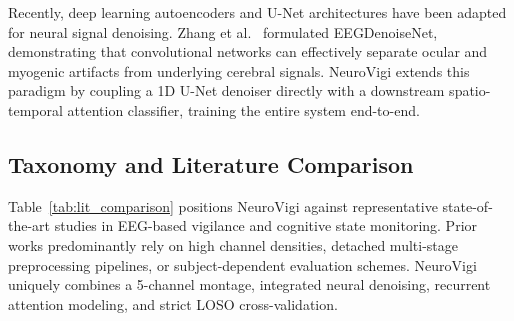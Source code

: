 \documentclass[conference]{IEEEtran}
\begin{document}
Recently, deep learning autoencoders and U-Net architectures have been adapted for neural signal denoising. Zhang et al.~\cite{zhang2021eegdenoisenet} formulated EEGDenoiseNet, demonstrating that convolutional networks can effectively separate ocular and myogenic artifacts from underlying cerebral signals. NeuroVigi extends this paradigm by coupling a 1D U-Net denoiser directly with a downstream spatio-temporal attention classifier, training the entire system end-to-end.

\subsection{Taxonomy and Literature Comparison}
Table~\ref{tab:lit_comparison} positions NeuroVigi against representative state-of-the-art studies in EEG-based vigilance and cognitive state monitoring. Prior works predominantly rely on high channel densities, detached multi-stage preprocessing pipelines, or subject-dependent evaluation schemes. NeuroVigi uniquely combines a 5-channel montage, integrated neural denoising, recurrent attention modeling, and strict LOSO cross-validation.
\end{document}
